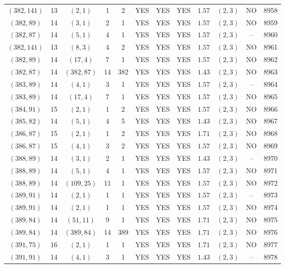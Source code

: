 \begin{longtable}{|c|c|c|c|c|c|c|c|c|c|c|c|}
$(382,141)$ & 13 & $(2,1)$ & 1 & 2 & YES & YES & YES & $1.57$ & $(2,3)$ & NO & 8958\\
$(382,89)$ & 14 & $(3,1)$ & 2 & 1 & YES & YES & YES & $1.57$ & $(2,3)$ & NO & 8959\\
$(382,87)$ & 14 & $(5,1)$ & 4 & 1 & YES & YES & YES & $1.57$ & $(2,3)$ & -- & 8960\\
$(382,141)$ & 13 & $(8,3)$ & 4 & 2 & YES & YES & YES & $1.57$ & $(2,3)$ & NO & 8961\\
$(382,89)$ & 14 & $(17,4)$ & 7 & 1 & YES & YES & YES & $1.57$ & $(2,3)$ & NO & 8962\\
$(382,87)$ & 14 & $(382,87)$ & 14 & 382 & YES & YES & YES & $1.43$ & $(2,3)$ & NO & 8963\\
$(383,89)$ & 14 & $(4,1)$ & 3 & 1 & YES & YES & YES & $1.57$ & $(2,3)$ & -- & 8964\\
$(383,89)$ & 14 & $(17,4)$ & 7 & 1 & YES & YES & YES & $1.57$ & $(2,3)$ & NO & 8965\\
$(384,91)$ & 15 & $(2,1)$ & 1 & 2 & YES & YES & YES & $1.57$ & $(2,3)$ & NO & 8966\\
$(385,82)$ & 14 & $(5,1)$ & 4 & 5 & YES & YES & YES & $1.43$ & $(2,3)$ & NO & 8967\\
$(386,87)$ & 15 & $(2,1)$ & 1 & 2 & YES & YES & YES & $1.71$ & $(2,3)$ & NO & 8968\\
$(386,87)$ & 15 & $(4,1)$ & 3 & 2 & YES & YES & YES & $1.57$ & $(2,3)$ & NO & 8969\\
$(388,89)$ & 14 & $(3,1)$ & 2 & 1 & YES & YES & YES & $1.43$ & $(2,3)$ & -- & 8970\\
$(388,89)$ & 14 & $(5,1)$ & 4 & 1 & YES & YES & YES & $1.57$ & $(2,3)$ & NO & 8971\\
$(388,89)$ & 14 & $(109,25)$ & 11 & 1 & YES & YES & YES & $1.57$ & $(2,3)$ & NO & 8972\\
$(389,91)$ & 14 & $(2,1)$ & 1 & 1 & YES & YES & YES & $1.57$ & $(2,3)$ & -- & 8973\\
$(389,91)$ & 14 & $(2,1)$ & 1 & 1 & YES & YES & YES & $1.57$ & $(2,3)$ & NO & 8974\\
$(389,84)$ & 14 & $(51,11)$ & 9 & 1 & YES & YES & YES & $1.71$ & $(2,3)$ & NO & 8975\\
$(389,84)$ & 14 & $(389,84)$ & 14 & 389 & YES & YES & YES & $1.71$ & $(2,3)$ & NO & 8976\\
$(391,75)$ & 16 & $(2,1)$ & 1 & 1 & YES & YES & YES & $1.71$ & $(2,3)$ & NO & 8977\\
$(391,91)$ & 14 & $(4,1)$ & 3 & 1 & YES & YES & YES & $1.43$ & $(2,3)$ & -- & 8978\\

\end{longtable}
